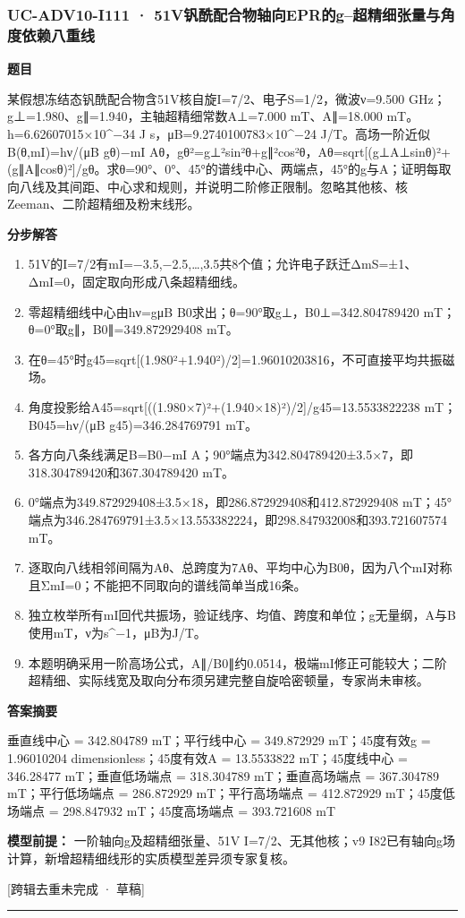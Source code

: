 \documentclass[UTF8,11pt,a4paper]{ctexart}
\begin{document}
\subsubsection*{UC-ADV10-I111 · 51V钒酰配合物轴向EPR的g–超精细张量与角度依赖八重线}
\noindent\textbf{题目}\par
某假想冻结态钒酰配合物含51V核自旋I=7/2、电子S=1/2，微波ν=9.500 GHz；g⊥=1.980、g∥=1.940，主轴超精细常数A⊥=7.000 mT、A∥=18.000 mT。h=6.62607015×10\textasciicircum{}−34 J s，μB=9.2740100783×10\textasciicircum{}−24 J/T。高场一阶近似B(θ,mI)=hν/(μB gθ)−mI Aθ，gθ²=g⊥²sin²θ+g∥²cos²θ，Aθ=sqrt[(g⊥A⊥sinθ)²+(g∥A∥cosθ)²]/gθ。求θ=90°、0°、45°的谱线中心、两端点，45°的g与A；证明每取向八线及其间距、中心求和规则，并说明二阶修正限制。忽略其他核、核Zeeman、二阶超精细及粉末线形。\par
\medskip\noindent\textbf{分步解答}
\begin{enumerate}
\item 51V的I=7/2有mI=−3.5,−2.5,…,3.5共8个值；允许电子跃迁ΔmS=±1、ΔmI=0，固定取向形成八条超精细线。
\item 零超精细线中心由hν=gμB B0求出；θ=90°取g⊥，B0⊥=342.804789420 mT；θ=0°取g∥，B0∥=349.872929408 mT。
\item 在θ=45°时g45=sqrt[(1.980²+1.940²)/2]=1.96010203816，不可直接平均共振磁场。
\item 角度投影给A45=sqrt[((1.980×7)²+(1.940×18)²)/2]/g45=13.5533822238 mT；B045=hν/(μB g45)=346.284769791 mT。
\item 各方向八条线满足B=B0−mI A；90°端点为342.804789420±3.5×7，即318.304789420和367.304789420 mT。
\item 0°端点为349.872929408±3.5×18，即286.872929408和412.872929408 mT；45°端点为346.284769791±3.5×13.553382224，即298.847932008和393.721607574 mT。
\item 逐取向八线相邻间隔为Aθ、总跨度为7Aθ、平均中心为B0θ，因为八个mI对称且ΣmI=0；不能把不同取向的谱线简单当成16条。
\item 独立枚举所有mI回代共振场，验证线序、均值、跨度和单位；g无量纲，A与B使用mT，ν为s\textasciicircum{}−1，μB为J/T。
\item 本题明确采用一阶高场公式，A∥/B0∥约0.0514，极端mI修正可能较大；二阶超精细、实际线宽及取向分布须另建完整自旋哈密顿量，专家尚未审核。
\end{enumerate}
\noindent\textbf{答案摘要}\par
垂直线中心 = 342.804789 mT；平行线中心 = 349.872929 mT；45度有效g = 1.96010204 dimensionless；45度有效A = 13.5533822 mT；45度线中心 = 346.28477 mT；垂直低场端点 = 318.304789 mT；垂直高场端点 = 367.304789 mT；平行低场端点 = 286.872929 mT；平行高场端点 = 412.872929 mT；45度低场端点 = 298.847932 mT；45度高场端点 = 393.721608 mT\par
\noindent\textbf{模型前提：}
一阶轴向g及超精细张量、51V I=7/2、无其他核；v9 I82已有轴向g场计算，新增超精细线形的实质模型差异须专家复核。\par
\noindent\textcolor{red!65!black}{[跨辑去重未完成 · 草稿]} \par
\medskip\hrule\medskip
{}
\end{document}
